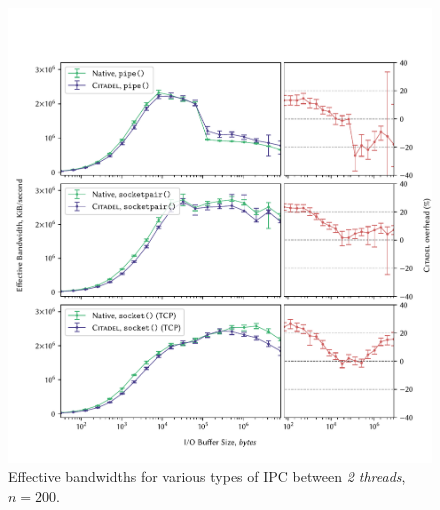 \begin{figure}[]
    \centering
    \includegraphics[width=\linewidth]{figures/graphs/ipc-2thread.pdf}
    \vspace{-5mm}
    \caption{Effective bandwidths for various types of IPC between \textit{2 threads}, $n=200$.}
    \label{fig:ipc-2thread-graph}
\end{figure}


